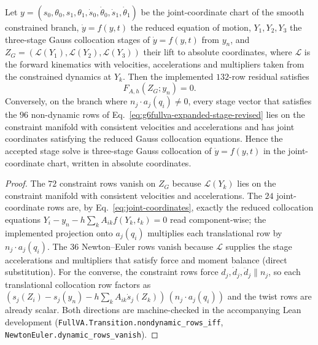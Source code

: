 
\begin{lemma}
\label{lem:exact-stage-identity}
Let $y=(s_0,\theta_0,s_1,\theta_1,\dot s_0,\dot\theta_0,\dot s_1,\dot\theta_1)$ be the
joint-coordinate chart of the smooth constrained branch, $\dot y=f(y,t)$ the reduced
equation of motion, $Y_1,Y_2,Y_3$ the three-stage Gauss collocation stages of $\dot y=f(y,t)$
from $y_n$, and $Z_G=(\mathcal L(Y_1),\mathcal L(Y_2),\mathcal L(Y_3))$ their lift to
absolute coordinates, where $\mathcal L$ is the forward kinematics with velocities,
accelerations and multipliers taken from the constrained dynamics at $Y_k$.  Then the
implemented $132$-row residual satisfies
\begin{equation}
  F_{A,h}(Z_G;y_n)=0 .
  \label{eq:exact-stage-identity}
\end{equation}
Conversely, on the branch where $n_j\cdot a_j(q_i)\neq0$, every stage vector that satisfies
the $96$ non-dynamic rows of Eq.~\eqref{eq:g6fullva-expanded-stage-revised} lies on the
constraint manifold with consistent velocities and accelerations and has joint coordinates
satisfying the reduced Gauss collocation equations.  Hence the accepted stage solve is
three-stage Gauss collocation of $\dot y=f(y,t)$ in the joint-coordinate chart, written in
absolute coordinates.
\end{lemma}

\begin{proof}
The $72$ constraint rows vanish on $Z_G$ because $\mathcal L(Y_k)$ lies on the constraint
manifold with consistent velocities and accelerations.  The $24$ joint-coordinate rows are,
by Eq.~\eqref{eq:joint-coordinates}, exactly the reduced collocation equations
$Y_i-y_n-h\sum_kA_{ik}f(Y_k,t_k)=0$ read component-wise; the implemented projection onto
$a_j(q_i)$ multiplies each translational row by $n_j\cdot a_j(q_i)$.  The $36$
Newton--Euler rows vanish because $\mathcal L$ supplies the stage accelerations and
multipliers that satisfy force and moment balance (direct substitution).  For the converse,
the constraint rows force $d_j,\dot d_j,\ddot d_j\parallel n_j$, so each translational
collocation row factors as $(s_j(Z_i)-s_j(y_n)-h\sum_kA_{ik}\dot s_j(Z_k))\,(n_j\cdot a_j(q_i))$
and the twist rows are already scalar.  Both directions are machine-checked in the
accompanying Lean development (\texttt{FullVA.Transition.nondynamic\_rows\_iff},
\texttt{NewtonEuler.dynamic\_rows\_vanish}).
\end{proof}

